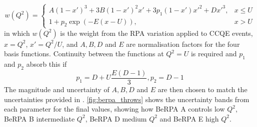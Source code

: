 \begin{equation}
w(Q^2) = 
\begin{cases}
A(1-x')^{3} + 3B(1-x')^{2}x' + 3p_{1}(1-x')x'^{2} + Dx'^{3}, & x \le U \\
1 + p_{2}\exp(-E(x-U)), & x > U
\end{cases}
\end{equation}
in which $w(Q^2)$ is the weight from the RPA variation applied to CCQE events, $x=Q^2$, $x'=Q^2/U$, and $A, B, D$ and $E$ are normalisation factors for the four basis functions. Continuity between the functions at $Q^2=U$ is required and $p_1$ and $p_2$ absorb this if
\begin{equation}
	p_1= D+U\frac{E(D-1)}{3}, 
	p_2 = D-1
\end{equation}
The magnitude and uncertainty of $A, B, D$ and $E$ are then chosen to match the uncertainties provided in \cite{nieves2}. \autoref{fig:berpa_throws} shows the uncertainty bands from each parameter for the final values, showing how BeRPA A controls low $Q^2$, BeRPA B intermediate $Q^2$, BeRPA D medium $Q^2$ and BeRPA E high $Q^2$.
